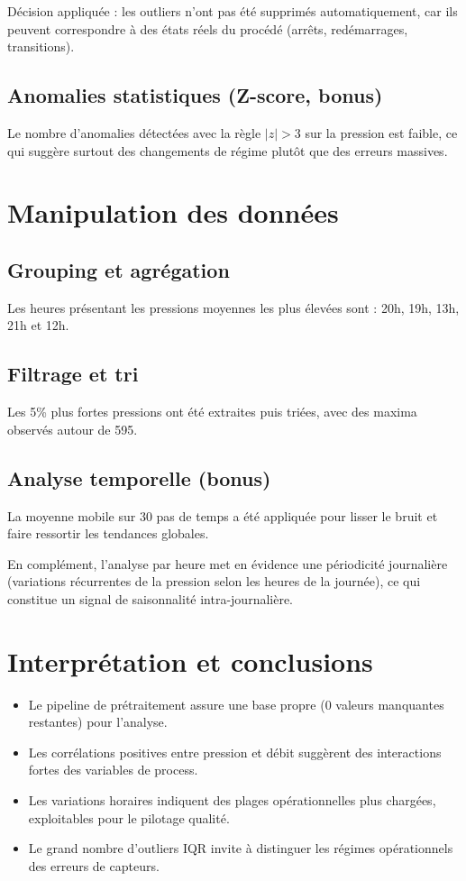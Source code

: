 \documentclass[11pt,a4paper]{article}
\begin{document}
Décision appliquée : les outliers n'ont pas été supprimés automatiquement, car ils peuvent correspondre à des états réels du procédé (arrêts, redémarrages, transitions).

\subsection{Anomalies statistiques (Z-score, bonus)}
Le nombre d'anomalies détectées avec la règle $|z| > 3$ sur la pression est faible, ce qui suggère surtout des changements de régime plutôt que des erreurs massives.

\section{Manipulation des données}
\subsection{Grouping et agrégation}
Les heures présentant les pressions moyennes les plus élevées sont : 20h, 19h, 13h, 21h et 12h.

\subsection{Filtrage et tri}
Les 5\% plus fortes pressions ont été extraites puis triées, avec des maxima observés autour de 595.

\subsection{Analyse temporelle (bonus)}
La moyenne mobile sur 30 pas de temps a été appliquée pour lisser le bruit et faire ressortir les tendances globales.

En complément, l'analyse par heure met en évidence une périodicité journalière (variations récurrentes de la pression selon les heures de la journée), ce qui constitue un signal de saisonnalité intra-journalière.

\section{Interprétation et conclusions}
\begin{itemize}
  \item Le pipeline de prétraitement assure une base propre (0 valeurs manquantes restantes) pour l'analyse.
  \item Les corrélations positives entre pression et débit suggèrent des interactions fortes des variables de process.
  \item Les variations horaires indiquent des plages opérationnelles plus chargées, exploitables pour le pilotage qualité.
  \item Le grand nombre d'outliers IQR invite à distinguer les régimes opérationnels des erreurs de capteurs.
\end{itemize}
\end{document}
